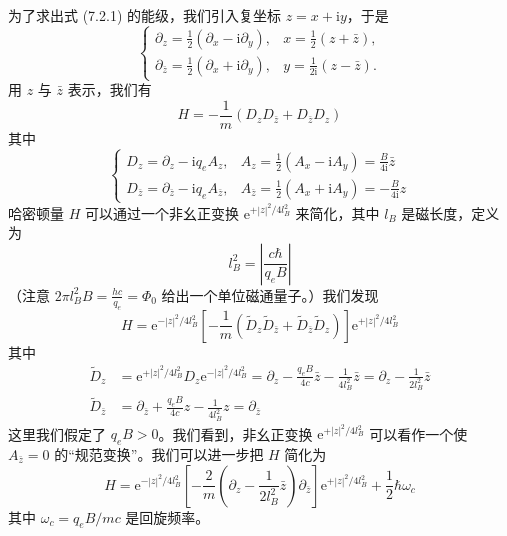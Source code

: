 为了求出式 (7.2.1) 的能级，我们引入复坐标 $z=x+\mathrm{i}y$，于是
\begin{equation*}
\left\{\begin{array}{ll}
\partial_z = \frac{1}{2}(\partial_x-\mathrm{i}\partial_y), & x = \frac{1}{2}(z+\bar{z}),\\
\partial_{\bar{z}} = \frac{1}{2}(\partial_x+\mathrm{i}\partial_y), & y = \frac{1}{2\mathrm{i}}(z-\bar{z}).
\end{array}\right.
\end{equation*}
用 $z$ 与 $\bar{z}$ 表示，我们有
\begin{equation*}
H = -\frac{1}{m}(D_zD_{\bar{z}} + D_{\bar{z}}D_z)
\end{equation*}
其中
\begin{equation*}
\left\{\begin{array}{ll}
D_z = \partial_z-\mathrm{i}q_eA_z, & A_z = \frac{1}{2}(A_x-\mathrm{i}A_y) = \frac{B}{4\mathrm{i}}\bar{z}\\
D_{\bar{z}} = \partial_{\bar{z}}-\mathrm{i}q_eA_{\bar{z}}, & A_{\bar{z}} = \frac{1}{2}(A_x+\mathrm{i}A_y) = -\frac{B}{4\mathrm{i}}z
\end{array}\right.
\end{equation*}
哈密顿量 $H$ 可以通过一个非幺正变换 $\mathrm{e}^{+|z|^2/4l_B^2}$ 来简化，其中 $l_B$ 是磁长度，定义为
\begin{equation*}
l_B^2 = \left|\frac{c\hbar}{q_eB}\right|
\end{equation*}
（注意 $2\pi l_B^2B = \frac{hc}{q_e} = \Phi_0$ 给出一个单位磁通量子。）我们发现
\begin{equation*}
H = \mathrm{e}^{-|z|^2/4l_B^2}\left[-\frac{1}{m}\left(\tilde{D}_z\tilde{D}_{\bar{z}} + \tilde{D}_{\bar{z}}\tilde{D}_z\right)\right]\mathrm{e}^{+|z|^2/4l_B^2}
\end{equation*}
其中
\begin{align*}
\tilde{D}_z &= \mathrm{e}^{+|z|^2/4l_B^2}D_z\mathrm{e}^{-|z|^2/4l_B^2} = \partial_z - \frac{q_eB}{4c}\bar{z} - \frac{1}{4l_B^2}\bar{z} = \partial_z - \frac{1}{2l_B^2}\bar{z}\\
\tilde{D}_{\bar{z}} &= \partial_{\bar{z}} + \frac{q_eB}{4c}z - \frac{1}{4l_B^2}z = \partial_{\bar{z}}
\end{align*}
这里我们假定了 $q_eB>0$。我们看到，非幺正变换 $\mathrm{e}^{+|z|^2/4l_B^2}$ 可以看作一个使 $A_{\bar{z}}=0$ 的“规范变换”。我们可以进一步把 $H$ 简化为
\begin{equation*}
H = \mathrm{e}^{-|z|^2/4l_B^2}\left[-\frac{2}{m}\left(\partial_z-\frac{1}{2l_B^2}\bar{z}\right)\partial_{\bar{z}}\right]\mathrm{e}^{+|z|^2/4l_B^2} + \frac{1}{2}\hbar\omega_c
\end{equation*}
其中 $\omega_c=q_eB/mc$ 是回旋频率。

